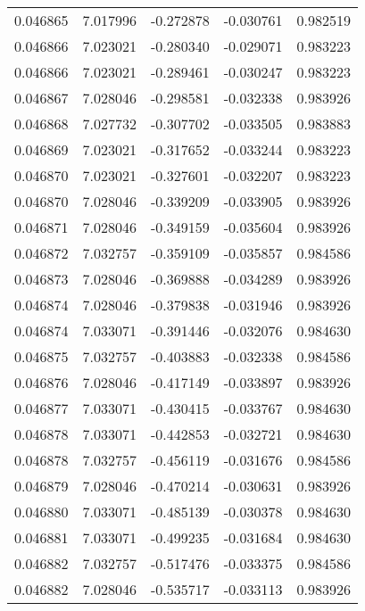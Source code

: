 \begin{tabular}{lrrrr}
0.046865    &  7.017996 & -0.272878 & -0.030761 &             0.982519 \\
0.046866    &  7.023021 & -0.280340 & -0.029071 &             0.983223 \\
0.046866    &  7.023021 & -0.289461 & -0.030247 &             0.983223 \\
0.046867    &  7.028046 & -0.298581 & -0.032338 &             0.983926 \\
0.046868    &  7.027732 & -0.307702 & -0.033505 &             0.983883 \\
0.046869    &  7.023021 & -0.317652 & -0.033244 &             0.983223 \\
0.046870    &  7.023021 & -0.327601 & -0.032207 &             0.983223 \\
0.046870    &  7.028046 & -0.339209 & -0.033905 &             0.983926 \\
0.046871    &  7.028046 & -0.349159 & -0.035604 &             0.983926 \\
0.046872    &  7.032757 & -0.359109 & -0.035857 &             0.984586 \\
0.046873    &  7.028046 & -0.369888 & -0.034289 &             0.983926 \\
0.046874    &  7.028046 & -0.379838 & -0.031946 &             0.983926 \\
0.046874    &  7.033071 & -0.391446 & -0.032076 &             0.984630 \\
0.046875    &  7.032757 & -0.403883 & -0.032338 &             0.984586 \\
0.046876    &  7.028046 & -0.417149 & -0.033897 &             0.983926 \\
0.046877    &  7.033071 & -0.430415 & -0.033767 &             0.984630 \\
0.046878    &  7.033071 & -0.442853 & -0.032721 &             0.984630 \\
0.046878    &  7.032757 & -0.456119 & -0.031676 &             0.984586 \\
0.046879    &  7.028046 & -0.470214 & -0.030631 &             0.983926 \\
0.046880    &  7.033071 & -0.485139 & -0.030378 &             0.984630 \\
0.046881    &  7.033071 & -0.499235 & -0.031684 &             0.984630 \\
0.046882    &  7.032757 & -0.517476 & -0.033375 &             0.984586 \\
0.046882    &  7.028046 & -0.535717 & -0.033113 &             0.983926 \\

\end{tabular}
